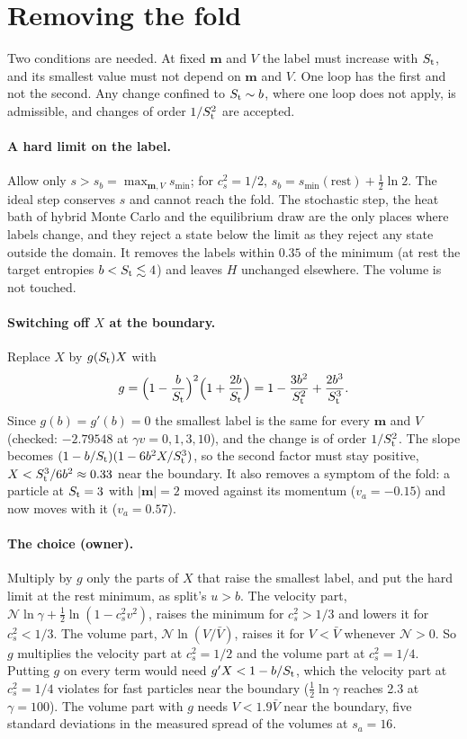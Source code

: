 \documentclass[11pt,aps,preprint,nofootinbib,superscriptaddress,tightenlines]{revtex4-2}
\def\st{\begin{equation}}
\def\stp{\end{equation}}
\let\oldparagraph\paragraph
\renewcommand{\paragraph}{\par\bigskip\oldparagraph}
\begin{document}
\section{Removing the fold}
\label{sec:fix}

Two conditions are needed.  At fixed $\bm m$ and $V$ the label must increase with $S_{\rm t}$, and its smallest value must not depend on $\bm m$ and $V$.
One loop has the first and not the second.  Any change confined to $S_{\rm t}\sim b$, where one loop does not apply, is admissible, and changes of order
$1/S_{\rm t}^2$ are accepted.

\paragraph{A hard limit on the label.}  Allow only $s>s_b=\max_{\bm m,V}s_{\min}$; for $c_s^2=1/2$, $s_b=s_{\min}(\text{rest})+\tfrac12\ln2$.  The ideal step
conserves $s$ and cannot reach the fold.  The stochastic step, the heat bath of hybrid Monte Carlo and the equilibrium draw are the only places where
labels change, and they reject a state below the limit as they reject any state outside the domain.  It removes the labels within $0.35$ of the minimum
(at rest the target entropies $b<S_{\rm t}\lesssim4$) and leaves $H$ unchanged elsewhere.  The volume is not touched.

\paragraph{Switching off $X$ at the boundary.}  Replace $X$ by $g(S_{\rm t})X$ with
\st
g=\Big(1-\frac b{S_{\rm t}}\Big)^2\Big(1+\frac{2b}{S_{\rm t}}\Big)=1-\frac{3b^2}{S_{\rm t}^2}+\frac{2b^3}{S_{\rm t}^3} .
\stp
Since $g(b)=g'(b)=0$ the smallest label is the same for every $\bm m$ and $V$ (checked: $-2.79548$ at $\gamma v=0,1,3,10$), and the change is of order
$1/S_{\rm t}^2$.  The slope becomes $(1-b/S_{\rm t})(1-6b^2X/S_{\rm t}^3)$, so the second factor must stay positive, $X<S_{\rm t}^3/6b^2\approx0.33$ near the
boundary.  It also removes a symptom of the fold: a particle at $S_{\rm t}=3$ with $|\bm m|=2$ moved against its momentum ($v_a=-0.15$) and now moves with it
($v_a=0.57$).

\paragraph{The choice (owner).}  Multiply by $g$ only the parts of $X$ that raise the smallest label, and put the hard limit at the rest minimum, as split's
$u>b$.  The velocity part, $\mathcal N\ln\gamma+\tfrac12\ln(1-c_s^2v^2)$, raises the minimum for $c_s^2>1/3$ and lowers it for $c_s^2<1/3$.  The volume part,
$\mathcal N\ln(V/\bar V)$, raises it for $V<\bar V$ whenever $\mathcal N>0$.  So $g$ multiplies the velocity part at $c_s^2=1/2$ and the volume part at
$c_s^2=1/4$.  Putting $g$ on every term would need $g'X<1-b/S_{\rm t}$, which the velocity part at $c_s^2=1/4$ violates for fast particles near the
boundary ($\tfrac12\ln\gamma$ reaches 2.3 at $\gamma=100$).  The volume part with $g$ needs $V<1.9\bar V$ near the boundary, five standard deviations in the
measured spread of the volumes at $s_a=16$.
\end{document}
